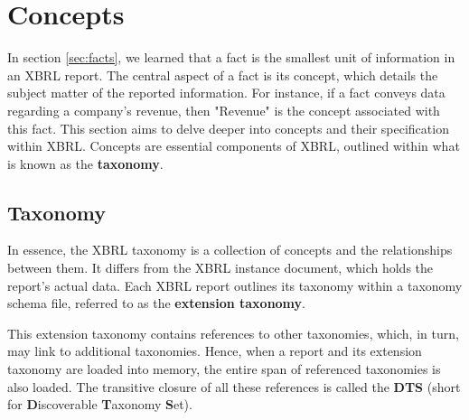 \section{Concepts}
\label{sec:concepts}

In section \ref{sec:facts}, we learned that a fact is the smallest unit of information in an XBRL report. 
The central aspect of a fact is its concept,
which details the subject matter of the reported information.
For instance, if a fact conveys data regarding a company's revenue, then "Revenue" is the concept associated with this fact.
This section aims to delve deeper into concepts and their specification within XBRL.
Concepts are essential components of XBRL, outlined within what is known as the \textbf{taxonomy}.

\subsection{Taxonomy}

In essence, the XBRL taxonomy is a collection of concepts and the relationships between them.
It differs from the XBRL instance document, which holds the report's actual data.
Each XBRL report outlines its taxonomy within a taxonomy schema file,
referred to as the \textbf{extension taxonomy}.

This extension taxonomy contains references to other taxonomies, which, in turn, may link to additional taxonomies.
Hence, when a report and its extension taxonomy are loaded into memory, the entire span of referenced taxonomies is also loaded.
The transitive closure of all these references is called the \textbf{DTS} (short for \textbf{D}iscoverable \textbf{T}axonomy \textbf{S}et).


